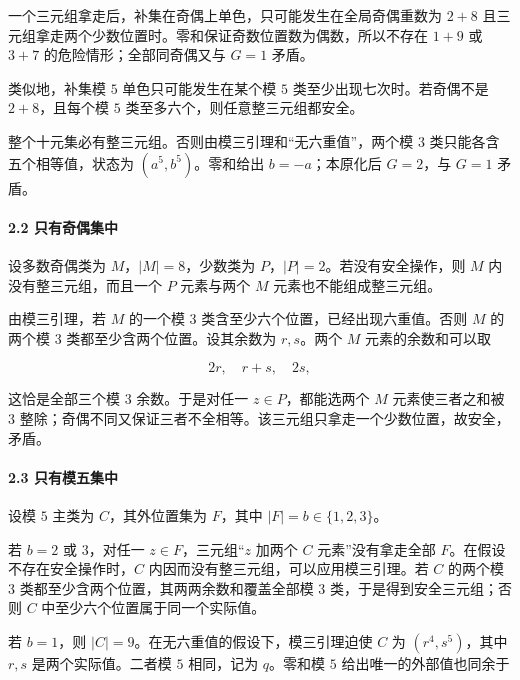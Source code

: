 \documentclass[11pt,a4paper]{article}
\theoremstyle{definition}
\numberwithin{equation}{section}
\begin{document}
{一个三元组拿走后，补集在奇偶上单色，只可能发生在全局奇偶重数为} \(2+8\) {且三元组拿走两个少数位置时。零和保证奇数位置数为偶数，所以不存在} \(1+9\) {或} \(3+7\) {的危险情形；全部同奇偶又与} \(G=1\) {矛盾。}

{类似地，补集模} \(5\) {单色只可能发生在某个模} \(5\) {类至少出现七次时。若奇偶不是} \(2+8\){，且每个模} \(5\) {类至多六个，则任意整三元组都安全。}

{整个十元集必有整三元组。否则由模三引理和``无六重值''，两个模} \(3\) {类只能各含五个相等值，状态为} \((a^5,b^5)\){。零和给出} \(b=-a\){；本原化后} \(G=2\){，与} \(G=1\) {矛盾。}

\paragraph*{\texorpdfstring{{2.2} {只有奇偶集中}}{2.2 只有奇偶集中}}\label{C35-h232}

{设多数奇偶类为} \(M\){，}\(|M|=8\){，少数类为} \(P\){，}\(|P|=2\){。若没有安全操作，则} \(M\) {内没有整三元组，而且一个} \(P\) {元素与两个} \(M\) {元素也不能组成整三元组。}

{由模三引理，若} \(M\) {的一个模} \(3\) {类含至少六个位置，已经出现六重值。否则} \(M\) {的两个模} \(3\) {类都至少含两个位置。设其余数为} \(r,s\){。两个} \(M\) {元素的余数和可以取}

\[
2r,\quad r+s,\quad2s,
\]

{这恰是全部三个模} \(3\) {余数。于是对任一} \(z\in P\){，都能选两个} \(M\) {元素使三者之和被} \(3\) {整除；奇偶不同又保证三者不全相等。该三元组只拿走一个少数位置，故安全，矛盾。}

\paragraph*{\texorpdfstring{{2.3} {只有模五集中}}{2.3 只有模五集中}}\label{C35-h233}

{设模} \(5\) {主类为} \(C\){，其外位置集为} \(F\){，其中} \(|F|=b\in\{1,2,3\}\){。}

{若} \(b=2\) {或} \(3\){，对任一} \(z\in F\){，三元组``}\(z\) {加两个} \(C\) {元素''没有拿走全部} \(F\){。在假设不存在安全操作时，}\(C\) {内因而没有整三元组，可以应用模三引理。若} \(C\) {的两个模} \(3\) {类都至少含两个位置，其两两余数和覆盖全部模} \(3\) {类，于是得到安全三元组；否则} \(C\) {中至少六个位置属于同一个实际值。}

{若} \(b=1\){，则} \(|C|=9\){。在无六重值的假设下，模三引理迫使} \(C\) {为} \((r^4,s^5)\){，其中} \(r,s\) {是两个实际值。二者模} \(5\) {相同，记为} \(q\){。零和模} \(5\) {给出唯一的外部值也同余于}
\end{document}

